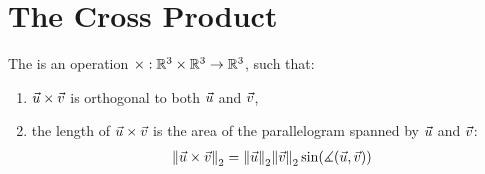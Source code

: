 \clearpage

\section{The Cross Product}
The  is an operation $\times : \mathbb{R}^3 \times \mathbb{R}^3 \to \mathbb{R}^3$, such that:
\begin{enumerate}
	\item $\vec{u} \times \vec{v}$ is orthogonal to both $\vec{u}$ and $\vec{v}$,
	\item the length of $\vec{u} \times \vec{v}$ is the area of the parallelogram spanned by $\vec{u}$ and $\vec{v}$:
	\begin{align*}
		\norm{\vec{u} \times \vec{v}}_2 = \norm{\vec{u}}_2 \norm{\vec{v}}_2 \sin(\measuredangle(\vec{u},\vec{v}))
	\end{align*}
\end{enumerate}

